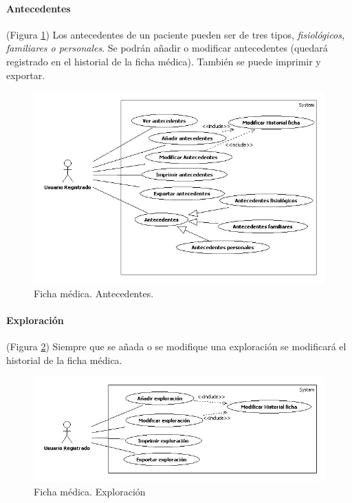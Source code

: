 			\paragraph{Antecedentes} %
			\label{par:antecedentes}
				(Figura \ref{fig:ant_fic}) Los antecedentes de un paciente pueden ser de tres tipos, \textit{fisiológicos, familiares o personales}. Se podrán añadir o modificar antecedentes (quedará registrado en el historial de la ficha médica). También se puede imprimir y exportar.
				\begin{figure}[H]
				  \centering
				    \includegraphics[width=14cm]{img/jpg/casos_uso/Antecedentes.jpg}
				  \caption{Ficha médica. Antecedentes.}
				  \label{fig:ant_fic}
				\end{figure}
			
			\paragraph{Exploración} %
			\label{par:exploracion}
				(Figura \ref{fig:exp_fic}) Siempre que se añada o se modifique una exploración se modificará el historial de la ficha médica.
				\begin{figure}[H]
				  \centering
				    \includegraphics[width=14cm]{img/jpg/casos_uso/Exploracion.jpg}
				  \caption{Ficha médica. Exploración}
				  \label{fig:exp_fic}
				\end{figure}
			
